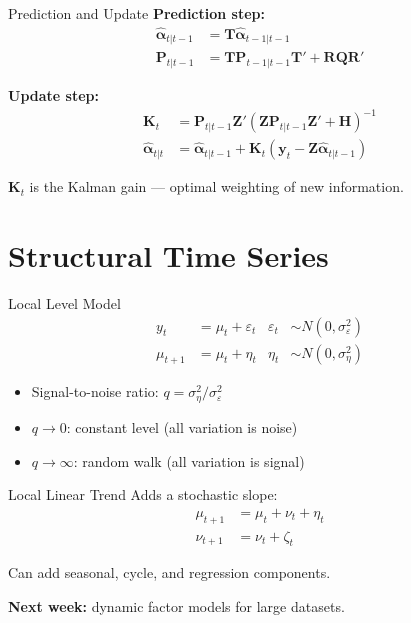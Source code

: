 \documentclass[aspectratio=169, 10pt]{beamer}
\begin{document}
\begin{frame}{Prediction and Update}
\textbf{Prediction step:}
\begin{align}
\hat{\boldsymbol{\alpha}}_{t|t-1} &= \mathbf{T}\hat{\boldsymbol{\alpha}}_{t-1|t-1} \\
\mathbf{P}_{t|t-1} &= \mathbf{T}\mathbf{P}_{t-1|t-1}\mathbf{T}' + \mathbf{R}\mathbf{Q}\mathbf{R}'
\end{align}

\textbf{Update step:}
\begin{align}
\mathbf{K}_t &= \mathbf{P}_{t|t-1}\mathbf{Z}'(\mathbf{Z}\mathbf{P}_{t|t-1}\mathbf{Z}' + \mathbf{H})^{-1} \\
\hat{\boldsymbol{\alpha}}_{t|t} &= \hat{\boldsymbol{\alpha}}_{t|t-1} + \mathbf{K}_t(\mathbf{y}_t - \mathbf{Z}\hat{\boldsymbol{\alpha}}_{t|t-1})
\end{align}

$\mathbf{K}_t$ is the \alert{Kalman gain} --- optimal weighting of new information.
\end{frame}

\section{Structural Time Series}

\begin{frame}{Local Level Model}
\begin{align}
y_t &= \mu_t + \varepsilon_t & \varepsilon_t &\sim N(0, \sigma_\varepsilon^2) \\
\mu_{t+1} &= \mu_t + \eta_t & \eta_t &\sim N(0, \sigma_\eta^2)
\end{align}

\begin{itemize}
    \item Signal-to-noise ratio: $q = \sigma_\eta^2 / \sigma_\varepsilon^2$
    \item $q \to 0$: constant level (all variation is noise)
    \item $q \to \infty$: random walk (all variation is signal)
\end{itemize}
\end{frame}

\begin{frame}{Local Linear Trend}
Adds a stochastic slope:
\begin{align}
\mu_{t+1} &= \mu_t + \nu_t + \eta_t \\
\nu_{t+1} &= \nu_t + \zeta_t
\end{align}

Can add seasonal, cycle, and regression components.

\vspace{0.5em}
\textbf{Next week:} dynamic factor models for large datasets.
\end{frame}
\end{document}
